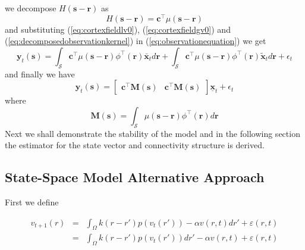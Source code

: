 \documentclass[onecolumn,draftcls]{IEEEtran}
\begin{document}
 we decompose $ H(\mathbf s-\mathbf r)$ as
 \begin{equation}
  H(\mathbf s-\mathbf r)= \mathbf c^{\top}\mu(\mathbf s-\mathbf r)
\label{eq:decomposedobservationkernel}
\end{equation}
and substituting  (\ref{eq:cortexfieldlv0}), (\ref{eq:cortexfieldgv0}) and (\ref{eq:decomposedobservationkernel}) in (\ref{eq:observationequation}) we get
\begin{equation}
 \mathbf y_t(\mathbf s)=\int_{\mathcal S}\mathbf c^{\top}\mu(\mathbf s-\mathbf r)\phi^{\top}(\mathbf r)\bar{\mathbf x}_{t}d\mathbf r+\int_{\mathcal S}\mathbf c^{\top}\mu(\mathbf s-\mathbf r)\phi^{\top}(\mathbf r)\tilde{\mathbf x}_{t}d\mathbf r+\epsilon_t
\end{equation}
and finally we have
\begin{equation}
\mathbf y_t(\mathbf s)= \begin{bmatrix}\mathbf c^{\top}\mathbf M(\mathbf s)&\mathbf c^{\top}\mathbf M(\mathbf s)\end{bmatrix}\underline{\mathbf x}_t+\epsilon_t
\end{equation}
where
\begin{equation}
 \mathbf M(\mathbf s)=\int_{\mathcal S}\mu(\mathbf s-\mathbf r)\phi^{\top}(\mathbf r)d\mathbf r
\end{equation}
Next we shall demonstrate the stability of the model and in the following section the estimator for the state vector and connectivity structure is derived.

\subsection{State-Space Model Alternative Approach}
First we define

\begin{eqnarray}
  {v_{t + 1}}\left( r \right) &=& \int_\Omega  {k\left( {r - r'} \right)p\left( {{v_t}\left( {r'} \right)} \right) - \alpha v\left( {r,t} \right)dr'}  + \varepsilon \left( {r,t} \right) \\
   &=& \int_\Omega  {k\left( {r - r'} \right)p\left( {{v_t}\left( {r'} \right)} \right)dr'}  - \alpha v\left( {r,t} \right) + \varepsilon \left( {r,t} \right)
\end{eqnarray}
\end{document}
